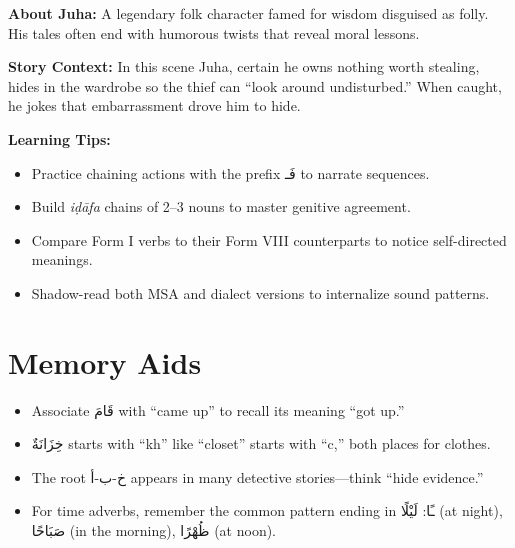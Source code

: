 \documentclass[a4paper,12pt]{article}
\begin{document}
\begin{tcolorbox}[colback=boxcolor,colframe=headercolor]
\textbf{About Juha:} A legendary folk character famed for wisdom disguised as folly. His tales often end with humorous twists that reveal moral lessons.

\vspace{0.5em}
\textbf{Story Context:} In this scene Juha, certain he owns nothing worth stealing, hides in the wardrobe so the thief can “look around undisturbed.” When caught, he jokes that embarrassment drove him to hide.

\vspace{0.5em}
\textbf{Learning Tips:}
\begin{itemize}
\item Practice chaining actions with the prefix \textarabic{فَـ} to narrate sequences.
\item Build \textit{iḍāfa} chains of 2–3 nouns to master genitive agreement.
\item Compare Form I verbs to their Form VIII counterparts to notice self-directed meanings.
\item Shadow-read both MSA and dialect versions to internalize sound patterns.
\end{itemize}
\end{tcolorbox}

\section{Memory Aids}

\begin{itemize}
\item Associate \textarabic{قَامَ} with “came up” to recall its meaning “got up.”
\item \textarabic{خِزَانَةٌ} starts with “kh” like “closet” starts with “c,” both places for clothes.
\item The root \textarabic{خ-ب-أ} appears in many detective stories—think “hide evidence.”
\item For time adverbs, remember the common pattern ending in \textarabic{ـًا}: \textarabic{لَيْلًا} (at night), \textarabic{صَبَاحًا} (in the morning), \textarabic{ظُهْرًا} (at noon).
\end{itemize}
\end{document}
